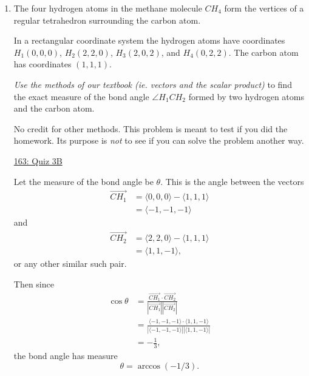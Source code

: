 \documentclass{ximera}
\begin{document}
\begin{question} \label{QPdre4340}

\begin{enumerate}
\item The four hydrogen atoms in the methane molecule $CH_4$ form the vertices of a regular tetrahedron surrounding the carbon atom. 

In a rectangular coordinate system the hydrogen atoms have coordinates $H_1(0,0,0)$, $H_2(2,2,0)$, $H_3(2,0,2)$, and $H_4(0,2,2)$. The carbon atom has coordinates $(1, 1, 1)$.

\emph{Use the methods of our textbook (ie. vectors and the scalar product)} to find the exact measure of the bond angle $\angle H_1 C H_2$ formed by two hydrogen atoms and the carbon atom.

No credit for other methods. This problem is meant to test if you did the homework. Its purpose is \emph{not} to see if you can solve the problem another way.

\begin{explanation}

\begin{onlineOnly}
    \begin{center}
\end{center}
\end{onlineOnly}

\href{https://www.desmos.com/3d/v}{163: Quiz 3B}

Let the measure of the bond angle be $\theta$. This is the angle between the vectors
\begin{align*}
   \overrightarrow{CH_1} &= \langle 0,0,0\rangle - \langle 1,1,1 \rangle \\
                                    &= \langle  -1,-1,-1 \rangle 
\end{align*}
and
\begin{align*}
   \overrightarrow{CH_2} &= \langle 2,2,0\rangle - \langle 1,1,1 \rangle \\
                                    &= \langle  1,1,-1 \rangle ,
\end{align*}
or any other similar such pair.

Then since
\begin{align*}
 \cos \theta &= \frac{\overrightarrow{CH_1}\cdot \overrightarrow{CH_2}}{\left| \overrightarrow{CH_1} \right| \left| \overrightarrow{CH_2} \right|} \\
                  & = \frac{\langle  -1,-1,-1 \rangle \cdot \langle  1,1,-1 \rangle}{|\langle  -1,-1,-1 \rangle ||\langle  1,1,-1 \rangle |} \\
                  &= -\frac{1}{3},
\end{align*}
the bond angle has measure
\[
    \theta = \arccos(-1/3).
\]

\end{explanation}
\end{enumerate}
\end{question}
\end{document}
